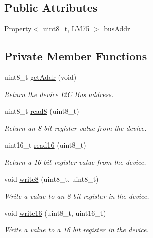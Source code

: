 \subsection*{Public Attributes}
\begin{DoxyCompactItemize}
\item 
Property$<$ uint8\-\_\-t, \hyperlink{class_l_m75}{L\-M75} $>$ \hyperlink{class_l_m75_a9f8dee59ac46f1c9740160402895dd5c}{bus\-Addr}
\end{DoxyCompactItemize}
\subsection*{Private Member Functions}
\begin{DoxyCompactItemize}
\item 
uint8\-\_\-t \hyperlink{class_l_m75_a9215f53f9ba2e7daa70ae06e7aa1f09c}{get\-Addr} (void)
\begin{DoxyCompactList}\small\item\em Return the device I2\-C Bus address. \end{DoxyCompactList}\item 
uint8\-\_\-t \hyperlink{class_l_m75_a6f4b5e329a3a5cba53f264fb3969e49b}{read8} (uint8\-\_\-t)
\begin{DoxyCompactList}\small\item\em Return an 8 bit register value from the device. \end{DoxyCompactList}\item 
uint16\-\_\-t \hyperlink{class_l_m75_ae28f5277c854beb262ab65ac7185b039}{read16} (uint8\-\_\-t)
\begin{DoxyCompactList}\small\item\em Return a 16 bit register value from the device. \end{DoxyCompactList}\item 
void \hyperlink{class_l_m75_a5ab4d982bd8371bff5a33b4e486a0edc}{write8} (uint8\-\_\-t, uint8\-\_\-t)
\begin{DoxyCompactList}\small\item\em Write a value to an 8 bit register in the device. \end{DoxyCompactList}\item 
void \hyperlink{class_l_m75_af3656fcf51812e2f4bfc93c1c01e99ef}{write16} (uint8\-\_\-t, uint16\-\_\-t)
\begin{DoxyCompactList}\small\item\em Write a value to a 16 bit register in the device. \end{DoxyCompactList}\end{DoxyCompactItemize}
